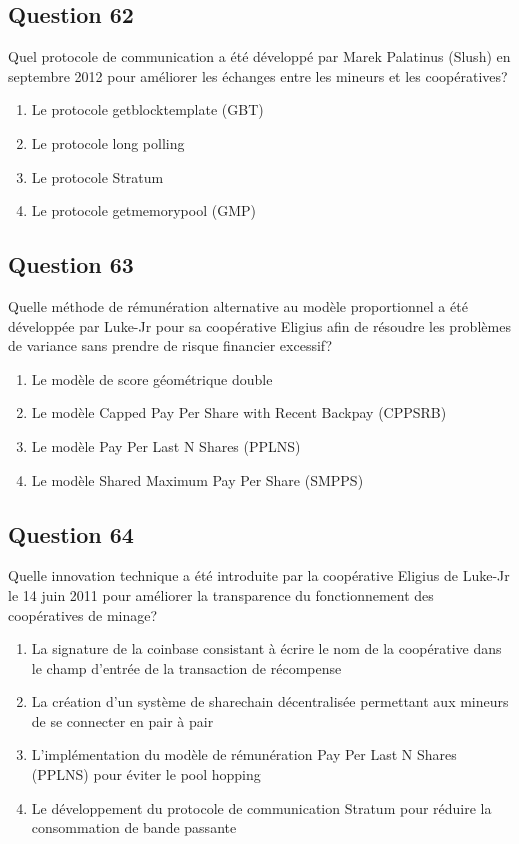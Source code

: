 \documentclass[12pt,a4paper]{article}
\begin{document}
\bigskip


\subsection*{Question 62}
Quel protocole de communication a été développé par Marek Palatinus (Slush) en septembre 2012 pour améliorer les échanges entre les mineurs et les coopératives?

\begin{enumerate}[label=\Alph*., leftmargin=*]
\item Le protocole getblocktemplate (GBT)
\item Le protocole long polling
\item Le protocole Stratum
\item Le protocole getmemorypool (GMP)
\end{enumerate}

\bigskip


\subsection*{Question 63}
Quelle méthode de rémunération alternative au modèle proportionnel a été développée par Luke-Jr pour sa coopérative Eligius afin de résoudre les problèmes de variance sans prendre de risque financier excessif?

\begin{enumerate}[label=\Alph*., leftmargin=*]
\item Le modèle de score géométrique double
\item Le modèle Capped Pay Per Share with Recent Backpay (CPPSRB)
\item Le modèle Pay Per Last N Shares (PPLNS)
\item Le modèle Shared Maximum Pay Per Share (SMPPS)
\end{enumerate}

\bigskip


\subsection*{Question 64}
Quelle innovation technique a été introduite par la coopérative Eligius de Luke-Jr le 14 juin 2011 pour améliorer la transparence du fonctionnement des coopératives de minage?

\begin{enumerate}[label=\Alph*., leftmargin=*]
\item La signature de la coinbase consistant à écrire le nom de la coopérative dans le champ d'entrée de la transaction de récompense
\item La création d'un système de sharechain décentralisée permettant aux mineurs de se connecter en pair à pair
\item L'implémentation du modèle de rémunération Pay Per Last N Shares (PPLNS) pour éviter le pool hopping
\item Le développement du protocole de communication Stratum pour réduire la consommation de bande passante
\end{enumerate}
\end{document}
